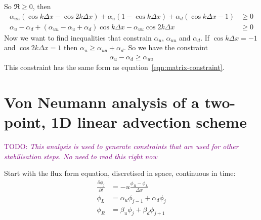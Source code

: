 \documentclass{article}
\newcommand{\TODO}[1]{\textcolor{purple}{TODO: \emph{#1}}}
\begin{document}
So $\Re \geq 0$, then
\begin{align}
\alpha_{uu} \left( \cos k\Delta x - \cos 2k\Delta x \right) + \alpha_u \left( 1 - \cos k \Delta x \right) + \alpha_d \left( \cos k\Delta x - 1 \right) &\geq 0 \\
\alpha_u - \alpha_d + \left( \alpha_{uu} - \alpha_u + \alpha_d \right) \cos k\Delta x - \alpha_{uu} \cos 2k\Delta x &\geq 0
\end{align}
Now we want to find inequalities that constrain $\alpha_u$, $\alpha_{uu}$ and $\alpha_d$.
If $\cos k\Delta x = -1$ and $\cos 2k\Delta x = 1$ then $\alpha_u \geq \alpha_{uu} + \alpha_d$.
So we have the constraint
\begin{align}
\alpha_u - \alpha_d \geq \alpha_{uu}
\end{align}
This constraint has the same form as equation~\eqref{eqn:matrix-constraint}.

\newpage

\section*{Von Neumann analysis of a two-point, 1D linear advection scheme}
\TODO{This analysis is used to generate constraints that are used for other stabilisation steps.  No need to read this right now}

Start with the flux form equation, discretised in space, continuous in time:
\begin{align}
\frac{\partial \phi_j}{\partial t} &= - u \frac{\phi_R - \phi_L}{\Delta x} \label{eqn:advection} \\
\phi_L &= \alpha_u \phi_{j-1} + \alpha_d \phi_j \\
\phi_R &= \beta_u \phi_j + \beta_d \phi_{j+1}
\end{align}
\end{document}
